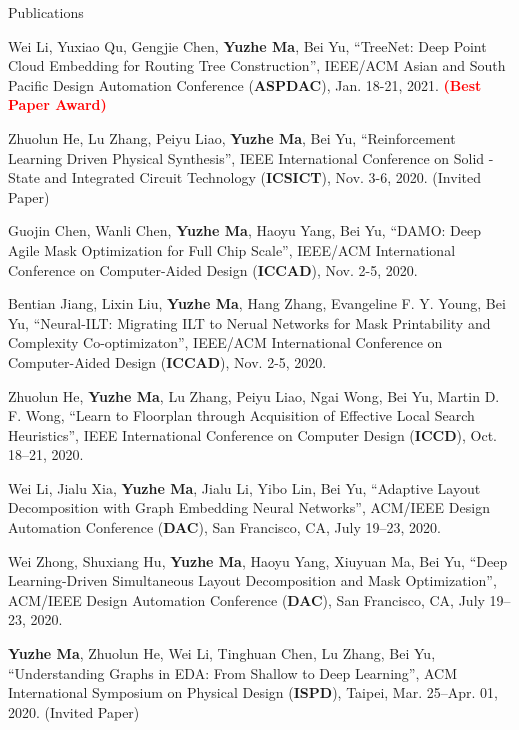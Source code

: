 \begin{rSection}{Publications}
\begin{etaremune}
\item {
        Wei Li, Yuxiao Qu, Gengjie Chen, \textbf{Yuzhe Ma}, Bei Yu,
        ``TreeNet: Deep Point Cloud Embedding for Routing Tree Construction'',
         IEEE/ACM Asian and South Pacific Design Automation Conference (\textbf{ASPDAC}), Jan. 18-21, 2021.
        \textcolor{red}{\textbf{(Best Paper Award)}}
    }

\item{
        Zhuolun He, Lu Zhang, Peiyu Liao, \textbf{Yuzhe Ma}, Bei Yu,
        ``Reinforcement Learning Driven Physical Synthesis'',
        IEEE International Conference on Solid -State and Integrated Circuit Technology (\textbf{ICSICT}), Nov. 3-6, 2020. (Invited Paper)
    }

\item{
        Guojin Chen, Wanli Chen, \textbf{Yuzhe Ma}, Haoyu Yang, Bei Yu,
        ``DAMO: Deep Agile Mask Optimization for Full Chip Scale'',
        IEEE/ACM International Conference on Computer-Aided Design (\textbf{ICCAD}), Nov. 2-5, 2020.
    }

\item{
        Bentian Jiang, Lixin Liu, \textbf{Yuzhe Ma}, Hang Zhang, Evangeline F. Y. Young, Bei Yu,
        ``Neural-ILT: Migrating ILT to Nerual Networks for Mask Printability and Complexity Co-optimizaton'',
        IEEE/ACM International Conference on Computer-Aided Design (\textbf{ICCAD}), Nov. 2-5, 2020.
    }

\item{
        Zhuolun He, \textbf{Yuzhe Ma}, Lu Zhang, Peiyu Liao, Ngai Wong, Bei Yu, Martin D. F. Wong,
        ``Learn to Floorplan through Acquisition of Effective Local Search Heuristics'',
        IEEE International Conference on Computer Design (\textbf{ICCD}), Oct. 18–21, 2020.
    }

\item{
        Wei Li, Jialu Xia, \textbf{Yuzhe Ma}, Jialu Li, Yibo Lin, Bei Yu,
        ``Adaptive Layout Decomposition with Graph Embedding Neural Networks'',
        ACM/IEEE Design Automation Conference (\textbf{DAC}), San Francisco, CA, July 19–23, 2020.
    }

\item{
        Wei Zhong, Shuxiang Hu, \textbf{Yuzhe Ma}, Haoyu Yang, Xiuyuan Ma, Bei Yu,
        ``Deep Learning-Driven Simultaneous Layout Decomposition and Mask Optimization'',
        ACM/IEEE Design Automation Conference (\textbf{DAC}), San Francisco, CA, July 19–23, 2020.
    }

\item{
        \textbf{Yuzhe Ma}, Zhuolun He, Wei Li, Tinghuan Chen, Lu Zhang, Bei Yu,
        ``Understanding Graphs in EDA: From Shallow to Deep Learning'',
        ACM International Symposium on Physical Design (\textbf{ISPD}), Taipei, Mar. 25–Apr. 01, 2020. (Invited Paper)
    }


\end{etaremune}
\end{rSection}
